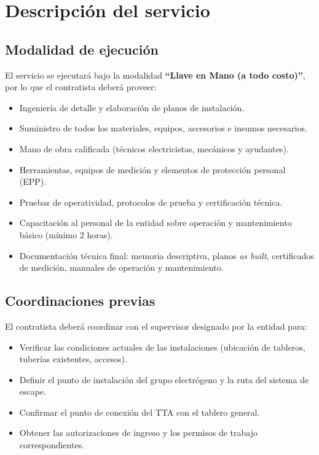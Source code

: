 \documentclass[12pt,a4paper]{article}
\begin{document}
\section{Descripción del servicio}

\subsection{Modalidad de ejecución}

El servicio se ejecutará bajo la modalidad \textbf{``Llave en Mano (a todo costo)''}, por lo que el contratista deberá proveer:

\begin{itemize}
  \item Ingeniería de detalle y elaboración de planos de instalación.
  \item Suministro de todos los materiales, equipos, accesorios e insumos necesarios.
  \item Mano de obra calificada (técnicos electricistas, mecánicos y ayudantes).
  \item Herramientas, equipos de medición y elementos de protección personal (EPP).
  \item Pruebas de operatividad, protocolos de prueba y certificación técnica.
  \item Capacitación al personal de la entidad sobre operación y mantenimiento básico (mínimo 2 horas).
  \item Documentación técnica final: memoria descriptiva, planos \emph{as built}, certificados de medición, manuales de operación y mantenimiento.
\end{itemize}

\subsection{Coordinaciones previas}

El contratista deberá coordinar con el supervisor designado por la entidad para:
\begin{itemize}
  \item Verificar las condiciones actuales de las instalaciones (ubicación de tableros, tuberías existentes, accesos).
  \item Definir el punto de instalación del grupo electrógeno y la ruta del sistema de escape.
  \item Confirmar el punto de conexión del TTA con el tablero general.
  \item Obtener las autorizaciones de ingreso y los permisos de trabajo correspondientes.
\end{itemize}
\end{document}
